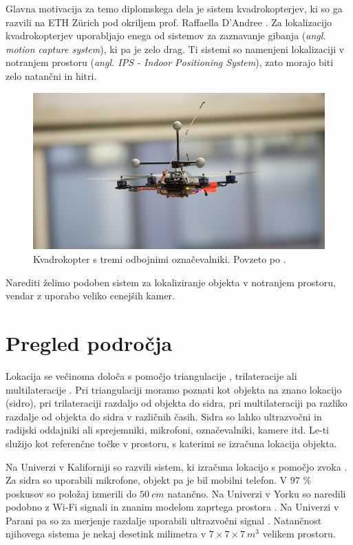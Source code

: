 \documentclass[a4paper, 12pt]{book}
\begin{document}
Glavna motivacija za temo diplomskega dela je sistem kvadrokopterjev, ki so ga razvili na ETH Zürich pod okriljem prof. Raffaella D’Andree \cite{fma}. Za lokalizacijo kvadrokopterjev uporabljajo enega od sistemov za zaznavanje gibanja (\emph{angl. motion capture system}), ki pa je zelo drag. Ti sistemi so namenjeni lokalizaciji v notranjem prostoru (\emph{angl. IPS - Indoor Positioning System}), zato morajo biti zelo natančni in hitri. 

\begin{figure}[H]
\centering
\includegraphics[width=\textwidth,height=\textheight,keepaspectratio]{flying_machine_arena.jpg}
\caption{Kvadrokopter s tremi odbojnimi označevalniki. Povzeto po \cite{fma}.}
\end{figure}

Narediti želimo podoben sistem za lokaliziranje objekta v notranjem prostoru, vendar z uporabo veliko cenejših kamer.

\section{Pregled področja}
Lokacija se večinoma določa s pomočjo triangulacije \cite{wiki:triangulation}, trilateracije \cite{wiki:trilateration} ali multilateracije \cite{wiki:multilateration}. Pri triangulaciji moramo poznati kot objekta na znano lokacijo (sidro), pri trilateraciji razdaljo od objekta do sidra, pri multilateraciji pa razliko razdalje od objekta do sidra v različnih časih. Sidra so lahko ultrazvočni in radijski oddajniki ali sprejemniki, mikrofoni, označevalniki, kamere itd. Le-ti služijo kot referenčne točke v prostoru, s katerimi se izračuna lokacija objekta.

Na Univerzi v Kaliforniji so razvili sistem, ki izračuna lokacijo s pomočjo zvoka \cite{mandal2005beep}. Za sidra so uporabili mikrofone, objekt pa je bil mobilni telefon. V $97$ \% poskusov so položaj izmerili do $50 \ cm$ natančno. Na Univerzi v Yorku so naredili podobno z Wi-Fi signali in znanim modelom zaprtega prostora \cite{chan2013dynamic}. Na Univerzi v Parani pa so za merjenje razdalje uporabili ultrazvočni signal \cite{auer20033d}. Natančnost njihovega sistema je nekaj desetink milimetra v $7\times7\times7 \ m^3$ velikem prostoru.
\end{document}
